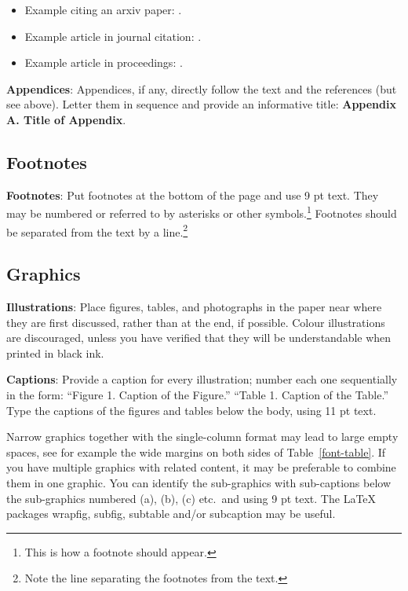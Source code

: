 \documentclass[11pt]{article}
\begin{document}
\begin{itemize}
	\item Example citing an arxiv paper: \cite{rasooli-tetrault-2015}. 
	\item Example article in journal citation: \cite{Aho:72}.
	\item Example article in proceedings: \cite{borsch2011}.
\end{itemize}

{\bf Appendices}: Appendices, if any, directly follow the text and the
references (but see above).  Letter them in sequence and provide an
informative title: {\bf Appendix A. Title of Appendix}.

\subsection{Footnotes}

{\bf Footnotes}: Put footnotes at the bottom of the page and use 9 pt
text. They may be numbered or referred to by asterisks or other
symbols.\footnote{This is how a footnote should appear.} Footnotes
should be separated from the text by a line.\footnote{Note the line
separating the footnotes from the text.}

\subsection{Graphics}

{\bf Illustrations}: Place figures, tables, and photographs in the
paper near where they are first discussed, rather than at the end, if
possible. 
Colour
illustrations are discouraged, unless you have verified that  
they will be understandable when printed in black ink.

{\bf Captions}: Provide a caption for every illustration; number each one
sequentially in the form:  ``Figure 1. Caption of the Figure.'' ``Table 1.
Caption of the Table.''  Type the captions of the figures and 
tables below the body, using 11 pt text.

Narrow graphics together with the single-column format may lead to
large empty spaces,
see for example the wide margins on both sides of Table~\ref{font-table}.
If you have multiple graphics with related content, it may be
preferable to combine them in one graphic.
You can identify the sub-graphics with sub-captions below the
sub-graphics numbered (a), (b), (c) etc.\ and using 9 pt text.
The \LaTeX{} packages wrapfig, subfig, subtable and/or subcaption
may be useful.
\end{document}
